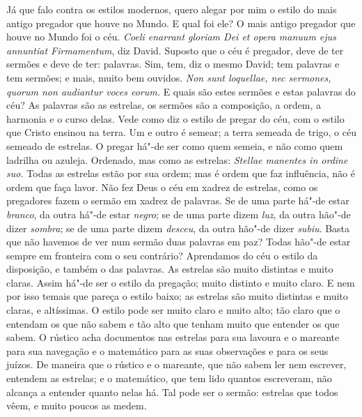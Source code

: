 Já que falo contra os estilos modernos, quero alegar por mim o estilo do
mais antigo pregador que houve no Mundo. E qual foi ele? O mais
antigo pregador que houve no Mundo foi o céu. \emph{Coeli enarrant
gloriam Dei et opera manuum ejus annuntiat Firmamentum}, diz David.
Suposto que o céu é pregador, deve de ter sermões e deve de ter:
palavras. Sim, tem, diz o mesmo David; tem palavras e tem sermões; e
mais, muito bem ouvidos. \emph{Non sunt loquellae, nec sermones, quorum
non audiantur voces eorum.} E quais são estes sermões e estas palavras
do céu? As palavras são as estrelas, os sermões são a composição, a
ordem, a harmonia e o curso delas. Vede como diz o estilo de pregar do
céu, com o estilo que Cristo ensinou na terra. Um e outro é semear; a
terra semeada de trigo, o céu semeado de estrelas. O pregar há"-de ser
como quem semeia, e não como quem ladrilha ou azuleja. Ordenado, mas
como as estrelas: \emph{Stellae manentes in ordine suo.} Todas as
estrelas estão por sua ordem; mas é ordem que faz influência, não é
ordem que faça lavor. Não fez Deus o céu em xadrez de estrelas, como os
pregadores fazem o sermão em xadrez de palavras. Se de uma parte há"-de
estar \emph{branco}, da outra há"-de estar \emph{negro}; se de uma parte
dizem \emph{luz}, da outra hão"-de dizer \emph{sombra}; se de uma parte
dizem \emph{desceu}, da outra hão"-de dizer \emph{subiu}. Basta que não
havemos de ver num sermão duas palavras em paz? Todas hão"-de estar
sempre em fronteira com o seu contrário? Aprendamos do céu o estilo da
disposição, e também o das palavras. As estrelas são muito distintas e
muito claras. Assim há"-de ser o estilo da pregação; muito distinto e
muito claro. E nem por isso temais que pareça o estilo baixo; as
estrelas são muito distintas e muito claras, e altíssimas. O estilo pode
ser muito claro e muito alto;
tão claro que o entendam os que não sabem e tão alto que tenham muito
que entender os que sabem. O rústico acha documentos nas estrelas para
sua lavoura e o mareante para sua navegação e o matemático para as suas
observações e para os seus juízos. De maneira que o rústico e o
mareante, que não sabem ler nem escrever, entendem as estrelas; e o
matemático, que tem lido quantos escreveram, não alcança a entender
quanto nelas há. Tal pode ser o sermão: estrelas que todos vêem, e
muito poucos as medem.

